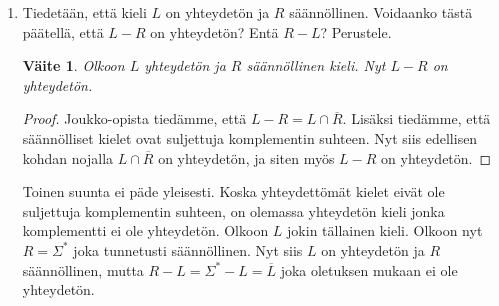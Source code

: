 \documentclass[a4paper,11pt, draft]{article}
\newtheorem*{claim}{Väite}
\newcommand{\ve}{\varepsilon}
\newenvironment{automata}[1][2.8]%
{\begin{tikzpicture}[->,>=stealth',shorten >=1pt,auto,node distance=#1cm,semithick]}%
{\end{tikzpicture}}
\begin{document}
\begin{enumerate}
\begin{enumerate}
\begin{proof}
\begin{center}
        \end{center}
%
        Pinoautomaatti $M_A$ on e\-pä\-de\-ter\-mi\-nis\-ti\-nen, mutta $M_B$
        ei. Pinoautomaatin e\-pä\-de\-ter\-mi\-nis\-tis\-ten siirtymien
        kohdalla uudessa automaatissa tilaparin jälkimmäinen alkio ei muutu.
        Ensimmäinen alkio noudattaa pinoautomaatin $M_A$ siirtymäfunktiota.
%
        \begin{center}
        \end{center}
%
        Luotu automaatti $M_{A \cap B}$ hyväksyy merkkijonon $w$ jos ja vain
        jos $M_A$ ja $M_B$ hyväksyvät merkkijonon $w$. Siis $M_{A \cap B}$
        tunnistaa kielen $A \cap B$.
      \end{proof}

    \item
      Tiedetään, että kieli $L$ on yhteydetön ja $R$ säännöllinen. Voidaanko
      tästä päätellä, että $L-R$ on yhteydetön? Entä $R-L$? Perustele.

      \begin{claim}
        Olkoon $L$ yhteydetön ja $R$ säännöllinen kieli. Nyt $L - R$ on
        yhteydetön.
      \end{claim}
      \begin{proof}
        Joukko-opista tiedämme, että $L - R = L \cap \overline{R}$. Lisäksi
        tiedämme, että säännölliset kielet ovat suljettuja komplementin
        suhteen. Nyt siis edellisen kohdan nojalla $L \cap \overline{R}$ on
        yhteydetön, ja siten myös $L - R$ on yhteydetön.
      \end{proof}

      Toinen suunta ei päde yleisesti. Koska yhteydettömät kielet eivät ole
      suljettuja komplementin suhteen, on olemassa yhteydetön kieli jonka
      komplementti ei ole yhteydetön. Olkoon $L$ jokin tällainen kieli. Olkoon
      nyt $R = \Sigma^*$ joka tunnetusti säännöllinen. Nyt siis $L$ on
      yhteydetön ja $R$ säännöllinen, mutta $R - L = \Sigma^* - L =
      \overline{L}$ joka oletuksen mukaan ei ole yhteydetön.
    \end{enumerate}
\end{enumerate}
\end{document}
